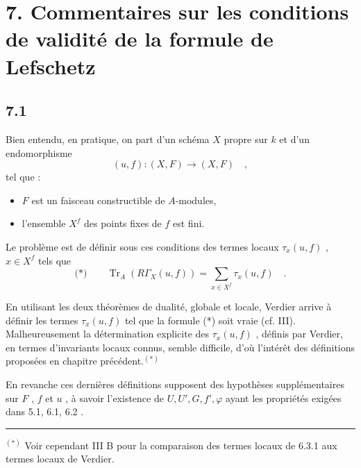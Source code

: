 \documentclass[11pt]{article}
\providecommand{\Tr}{\operatorname{Tr}}
\providecommand{\Tr}{\operatorname{Tr}}
\providecommand{\Tr}{\operatorname{Tr}}
\providecommand{\Tr}{\operatorname{Tr}}
\providecommand{\Tr}{\operatorname{Tr}}
\begin{document}
\section*{7. Commentaires sur les conditions de validité de la formule de Lefschetz}

\subsection*{7.1}
Bien entendu, en pratique, on part d'un schéma $X$ propre sur $k$ et d'un endomorphisme
\[
(u, f) : (X, F) \longrightarrow (X, F) \quad ,
\]
tel que :
\begin{itemize}
\item $F$ est un faisceau constructible de $A$-modules,
\item l'ensemble $X^f$ des points fixes de $f$ est fini.
\end{itemize}

Le problème est de définir sous ces conditions des termes locaux $\tau_x(u, f)$ , $x \in X^f$ tels que
\[
\text{(*)} \qquad \Tr_A(R\Gamma_X(u, f)) = \sum_{x \in X^f} \tau_x(u, f) \quad .
\]

En utilisant les deux théorèmes de dualité, globale et locale, Verdier arrive à définir les termes $\tau_x(u, f)$ tel que la formule (*) soit vraie (cf. III). Malheureusement la détermination explicite des $\tau_x(u, f)$ , définis par Verdier, en termes d'invariants locaux connus, semble difficile, d'où l'intérêt des définitions proposées en chapitre précédent.$^{(*)}$

En revanche ces dernières définitions supposent des hypothèses supplémentaires sur $F$ , $f$ et $u$ , à savoir l'existence de $U, U', G, f', \varphi$ ayant les propriétés exigées dans 5.1, 6.1, 6.2 .

\bigskip
\noindent
\rule{6cm}{0.4pt}

$^{(*)}$ Voir cependant III B pour la comparaison des termes locaux de 6.3.1 aux termes locaux de Verdier.
\end{document}
